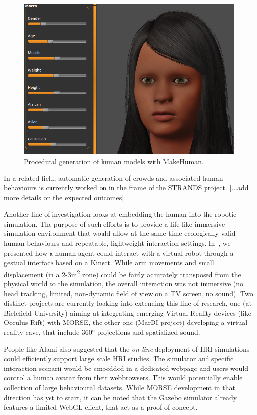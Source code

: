 \documentclass[conference]{IEEEtran}
\begin{document}
\begin{figure}[tb]
  \centering
  \includegraphics[width=.9\columnwidth]{figs/makehuman.png}
  \caption{Procedural generation of human models with {\sc MakeHuman}.}
  \label{fig:makehuman}
\end{figure}

In a related field, automatic generation of crowds and associated human
behaviours is currently worked on in the frame of the STRANDS project.
[...add more details on the expected outcomes]

Another line of investigation looks at embedding the human into the robotic
simulation. The purpose of such efforts is to provide a life-like immersive
simulation environment that would allow at the same time ecologically valid
human behaviours and repeatable, lightweight interaction settings.
In~\cite{lemaignan2012morse}, we presented how a human agent could interact with
a virtual robot through a gestual interface based on a Kinect. While arm
movements and small displacement (in a 2-3m\textsuperscript{2} zone) could be fairly
accurately transposed from the physical world to the simulation, the overall
interaction was not immersive (no head tracking, limited, non-dynamic field of
view on a TV screen, no sound). Two distinct projects are currently looking into
extending this line of research, one (at Bielefield University) aiming at
integrating emerging Virtual Reality devices (like Occulus Rift) with MORSE, the
other one (MarDI project) developing a virtual reality cave, that include 360°
projections and spatialized sound.

People like Alami also suggested that the \emph{on-line} deployment of HRI
simulations could efficiently support large scale HRI studies. The simulator and
specific interaction scenarii would be embedded in a dedicated webpage and users
would control a human avatar from their webbrowsers. This would potentially
enable collection of large behavioural datasets. While MORSE development in
that direction has yet to start, it can be noted that the Gazebo simulator
already features a limited WebGL client, that act as a proof-of-concept.
\end{document}
